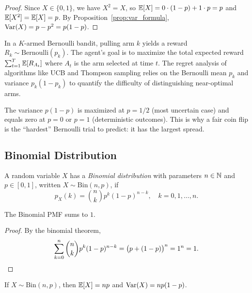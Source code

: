 \documentclass[11pt,a4paper]{article}
\begin{document}
\begin{proof}
Since $X \in \{0,1\}$, we have $X^2 = X$, so
$\mathbb{E}[X] = 0 \cdot (1-p) + 1 \cdot p = p$ and
$\mathbb{E}[X^2] = \mathbb{E}[X] = p$. By
Proposition~\ref{prop:var_formula},
$\operatorname{Var}(X) = p - p^2 = p(1-p)$.
\end{proof}

\begin{rlconnection}[title={Bernoulli Rewards in Multi-Armed Bandits}]
In a $K$-armed Bernoulli bandit, pulling arm $k$ yields a reward
$R_k \sim \mathrm{Bernoulli}(p_k)$. The agent's goal is to maximize the
total expected reward $\sum_{t=1}^T \mathbb{E}[R_{A_t}]$ where $A_t$ is the arm
selected at time $t$. The regret analysis of algorithms like UCB and
Thompson sampling relies on the Bernoulli mean $p_k$ and variance
$p_k(1 - p_k)$ to quantify the difficulty of distinguishing near-optimal
arms.
\end{rlconnection}

\begin{example}
\label{ex:bernoulli_var}
The variance $p(1-p)$ is maximized at $p = 1/2$ (most uncertain case)
and equals zero at $p = 0$ or $p = 1$ (deterministic outcomes). This is
why a fair coin flip is the ``hardest'' Bernoulli trial to predict: it
has the largest spread.
\end{example}

\subsection{Binomial Distribution}

\begin{definition}
\label{def:binomial}
A random variable $X$ has a \emph{Binomial distribution} with parameters
$n \in \mathbb{N}$ and $p \in [0,1]$, written $X \sim \mathrm{Bin}(n, p)$, if
\[
    p_X(k) = \binom{n}{k} p^k (1-p)^{n-k}, \quad k = 0, 1, \ldots, n.
\]
\end{definition}

\begin{proposition}
\label{prop:binomial_valid}
The Binomial PMF sums to $1$.
\end{proposition}

\begin{proof}
By the binomial theorem,
\[
    \sum_{k=0}^n \binom{n}{k} p^k (1-p)^{n-k}
    = \bigl(p + (1-p)\bigr)^n = 1^n = 1. \qedhere
\]
\end{proof}

\begin{theorem}
\label{thm:binomial_moments}
If $X \sim \mathrm{Bin}(n, p)$, then $\mathbb{E}[X] = np$ and
$\operatorname{Var}(X) = np(1-p)$.
\end{theorem}
\end{document}
